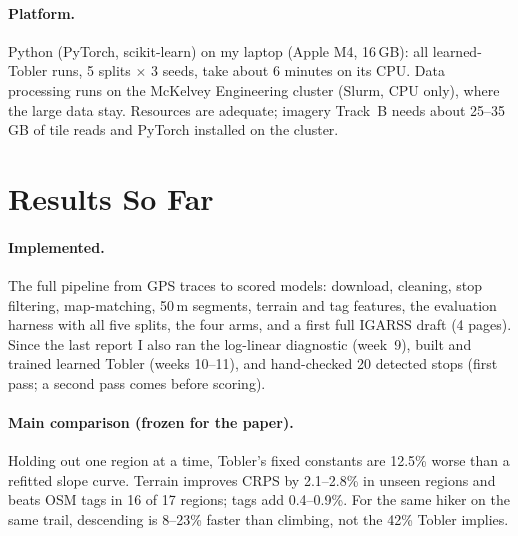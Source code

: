 \documentclass[10pt,twocolumn,letterpaper]{article}
\begin{document}
\paragraph{Platform.} Python (PyTorch, scikit-learn) on my laptop (Apple M4, 16\,GB): all learned-Tobler runs, 5 splits $\times$ 3 seeds, take about 6 minutes on its CPU. Data processing runs on the McKelvey Engineering cluster (Slurm, CPU only), where the large data stay. Resources are adequate; imagery Track~B needs about 25--35\,GB of tile reads and PyTorch installed on the cluster.

\section{Results So Far}
\label{sec:results}

\paragraph{Implemented.} The full pipeline from GPS traces to scored models: download, cleaning, stop filtering, map-matching, 50\,m segments, terrain and tag features, the evaluation harness with all five splits, the four arms, and a first full IGARSS draft (4 pages). Since the last report I also ran the log-linear diagnostic (week~9), built and trained learned Tobler (weeks 10--11), and hand-checked 20 detected stops (first pass; a second pass comes before scoring).

\paragraph{Main comparison (frozen for the paper).} Holding out one region at a time, Tobler's fixed constants are 12.5\% worse than a refitted slope curve. Terrain improves CRPS by 2.1--2.8\% in unseen regions and beats OSM tags in 16 of 17 regions; tags add 0.4--0.9\%. For the same hiker on the same trail, descending is 8--23\% faster than climbing, not the 42\% Tobler implies.
\end{document}
